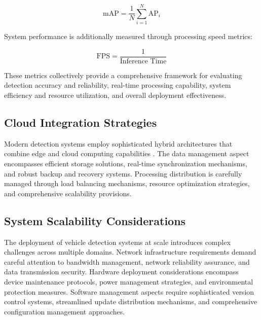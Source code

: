 \begin{equation}
\mbox{mAP} = \frac{1}{N} \sum_{i=1}^{N} \mbox{AP}_i
\label{eq:mAP}
\end{equation}

System performance is additionally measured through processing speed metrics:

\begin{equation}
\mbox{FPS} = \frac{1}{\mbox{Inference Time}}
\label{eq:fps}
\end{equation}

These metrics collectively provide a comprehensive framework for evaluating detection accuracy and reliability, real-time processing capability, system efficiency and resource utilization, and overall deployment effectiveness.

\subsection{Cloud Integration Strategies}

Modern detection systems employ sophisticated hybrid architectures that combine edge and cloud computing capabilities \cite{hubdat2024}. The data management aspect encompasses efficient storage solutions, real-time synchronization mechanisms, and robust backup and recovery systems. Processing distribution is carefully managed through load balancing mechanisms, resource optimization strategies, and comprehensive scalability provisions.

\subsection{System Scalability Considerations}

The deployment of vehicle detection systems at scale introduces complex challenges across multiple domains. Network infrastructure requirements demand careful attention to bandwidth management, network reliability assurance, and data transmission security. Hardware deployment considerations encompass device maintenance protocols, power management strategies, and environmental protection measures. Software management aspects require sophisticated version control systems, streamlined update distribution mechanisms, and comprehensive configuration management approaches.